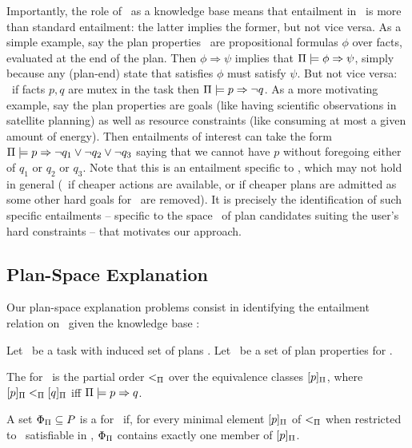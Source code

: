 Importantly, the role of \plans\ as a knowledge base means that
entailment in \plans\ is more than standard entailment: the latter
implies the former, but not vice versa. As a simple example, say the
plan properties \props\ are propositional formulas $\phi$ over facts,
evaluated at the end of the plan. Then $\phi \Rightarrow \psi$ implies
that $\Pi \models \phi \Rightarrow \psi$, simply because any (plan-end)
state that satisfies $\phi$ must satisfy $\psi$. But not vice versa:
\eg\ if facts $p, q$ are mutex in the task then
$\Pi \models p \Rightarrow \neg q$. As a more motivating example, say the
plan properties are goals (like having scientific observations in
satellite planning) as well as resource constraints (like consuming at
most a given amount of energy). Then entailments of interest can take
the form $\Pi \models p \Rightarrow \neg q_1 \vee \neg q_2 \vee \neg q_3$
saying that we cannot have $p$ without foregoing either of $q_1$ or
$q_2$ or $q_3$. Note that this is an entailment specific to \plans,
which may not hold in general (\eg\ if cheaper actions are available,
or if cheaper plans are admitted as some other hard goals for
\plans\ are removed). It is precisely the identification of such
specific entailments -- specific to the space \plans\ of plan
candidates suiting the user's hard constraints -- that motivates our
approach.





\subsection{Plan-Space Explanation}

Our plan-space explanation problems consist in identifying the
entailment relation on \props\ given the knowledge base \plans:

\begin{definition}
Let \task\ be a task with induced set of plans \plans. Let \props\ be
a set of plan properties for \task.

The  for \plans\ is the
partial order $<_{\Pi}$ over the equivalence classes
$[p]_{\Pi}$, where $[p]_{\Pi} <_{\Pi}
[q]_{\Pi}$ iff $\Pi \models p \Rightarrow q$.

A set $\Phi_{\Pi} \subseteq P$ is a  for \plans\ if, for every minimal
element $[p]_{\Pi}$ of $<_{\Pi}$ when restricted to
\prop\ satisfiable in \plans, $\Phi_{\Pi}$ contains exactly one
member of $[p]_{\Pi}$.
\end{definition}

